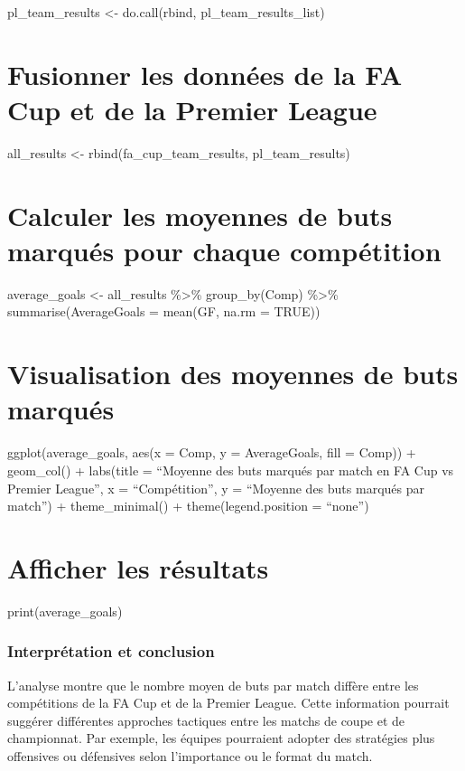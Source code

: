 \documentclass[
]{article}
\begin{document}
pl\_team\_results \textless- do.call(rbind, pl\_team\_results\_list)

\section{Fusionner les données de la FA Cup et de la Premier
League}\label{fusionner-les-donnuxe9es-de-la-fa-cup-et-de-la-premier-league}

all\_results \textless- rbind(fa\_cup\_team\_results, pl\_team\_results)

\section{Calculer les moyennes de buts marqués pour chaque
compétition}\label{calculer-les-moyennes-de-buts-marquuxe9s-pour-chaque-compuxe9tition}

average\_goals \textless- all\_results \%\textgreater\% group\_by(Comp)
\%\textgreater\% summarise(AverageGoals = mean(GF, na.rm = TRUE))

\section{Visualisation des moyennes de buts
marqués}\label{visualisation-des-moyennes-de-buts-marquuxe9s-1}

ggplot(average\_goals, aes(x = Comp, y = AverageGoals, fill = Comp)) +
geom\_col() + labs(title = ``Moyenne des buts marqués par match en FA
Cup vs Premier League'', x = ``Compétition'', y = ``Moyenne des buts
marqués par match'') + theme\_minimal() + theme(legend.position =
``none'')

\section{Afficher les résultats}\label{afficher-les-ruxe9sultats}

print(average\_goals)

\subsubsection{Interprétation et
conclusion}\label{interpruxe9tation-et-conclusion}

L'analyse montre que le nombre moyen de buts par match diffère entre les
compétitions de la FA Cup et de la Premier League. Cette information
pourrait suggérer différentes approches tactiques entre les matchs de
coupe et de championnat. Par exemple, les équipes pourraient adopter des
stratégies plus offensives ou défensives selon l'importance ou le format
du match.
\end{document}

